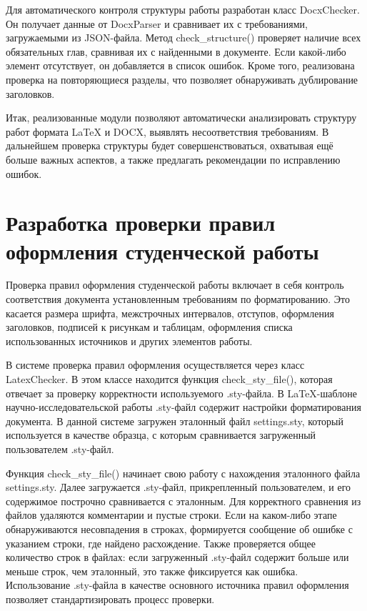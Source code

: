 \documentclass{report}
\begin{document}
Для автоматического контроля структуры работы разработан класс DocxChecker. Он получает данные от DocxParser и сравнивает их с требованиями, загружаемыми из JSON-файла. Метод check\_structure() проверяет наличие всех обязательных глав, сравнивая их с найденными в документе. Если какой-либо элемент отсутствует, он добавляется в список ошибок. Кроме того, реализована проверка на повторяющиеся разделы, что позволяет обнаруживать дублирование заголовков.

Итак, реализованные модули позволяют автоматически анализировать структуру работ формата LaTeX и DOCX, выявлять несоответствия требованиям. В дальнейшем проверка структуры будет совершенствоваться, охватывая ещё больше важных аспектов, а также предлагать рекомендации по исправлению ошибок.


\section{Разработка проверки правил оформления студенческой работы}

Проверка правил оформления студенческой работы включает в себя контроль соответствия документа установленным требованиям по форматированию. Это касается размера шрифта, межстрочных интервалов, отступов, оформления заголовков, подписей к рисункам и таблицам, оформления списка использованных источников и других элементов работы.

В системе проверка правил оформления осуществляется через класс LatexChecker. В этом классе находится функция check\_sty\_file(), которая отвечает за проверку корректности используемого .sty-файла. В LaTeX-шаблоне научно-исследовательской работы .sty-файл содержит настройки форматирования документа. В данной системе загружен эталонный файл settings.sty, который используется в качестве образца, с которым сравнивается загруженный пользователем .sty-файл.

Функция check\_sty\_file() начинает свою работу с нахождения эталонного файла settings.sty. Далее загружается .sty-файл, прикрепленный пользователем, и его содержимое построчно сравнивается с эталонным. Для корректного сравнения из файлов удаляются комментарии и пустые строки. Если на каком-либо этапе обнаруживаются несовпадения в строках, формируется сообщение об ошибке с указанием строки, где найдено расхождение. Также проверяется общее количество строк в файлах: если загруженный .sty-файл содержит больше или меньше строк, чем эталонный, это также фиксируется как ошибка. Использование .sty-файла в качестве основного источника правил оформления позволяет стандартизировать процесс проверки.
\end{document}
